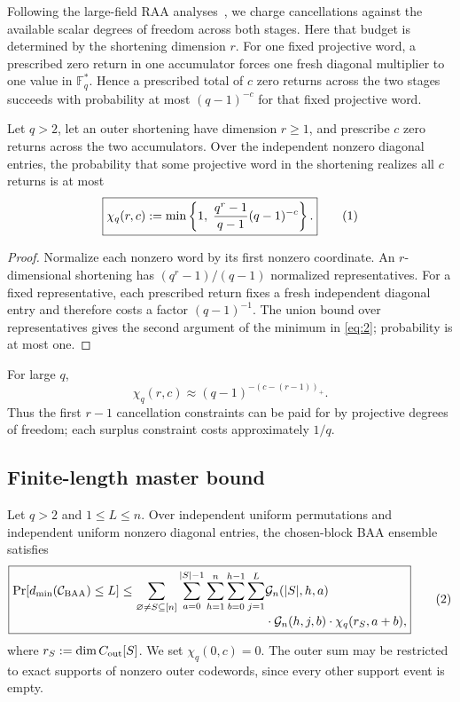 \documentclass[runningheads,envcountsame,envcountsect]{llncs}
\newcommand{\F}{\mathbb F}
\newcommand{\Prb}{\Pr}
\newcommand{\cC}{\mathcal C}
\newcommand{\cG}{\mathcal G}
\newcommand{\eqnumlabel}[1]{%
  \refstepcounter{equation}\tag{\theequation}\label{#1}%
}
\begin{document}
Following the large-field RAA analyses~\cite{akhiani26,khabbazian26}, we charge
cancellations against the available scalar degrees of freedom across both
stages.  Here that budget is determined by the shortening dimension $r$.
For one fixed projective word, a prescribed zero return in one accumulator
forces one fresh diagonal multiplier to one value in $\F_q^\ast$.
Hence a prescribed total of $c$ zero returns across the two stages succeeds
with probability at most $(q-1)^{-c}$ for that fixed projective word.

\begin{lemma}
\label{lem:projective-cancellation}
Let $q>2$, let an outer shortening have dimension $r\ge1$, and prescribe $c$
zero returns across the two accumulators.  Over the independent nonzero
diagonal entries, the probability that some projective word in the shortening
realizes all $c$ returns is at most
\[
    \boxed{
    \chi_q(r,c)
      :=
    \min\left\{
        1,\;
        \frac{q^r-1}{q-1}(q-1)^{-c}
    \right\}.
    }
    \eqnumlabel{eq:2}
\]
\end{lemma}

\begin{proof}
Normalize each nonzero word by its first nonzero coordinate.  An
$r$-dimensional shortening has $(q^r-1)/(q-1)$ normalized representatives.
For a fixed representative, each prescribed return fixes a fresh independent
diagonal entry and therefore costs a factor $(q-1)^{-1}$.  The union bound over
representatives gives the second argument of the minimum in \eqref{eq:2}; probability
is at most one.
\end{proof}

For large $q$,
\[
    \chi_q(r,c)
      \approx
    (q-1)^{-(c-(r-1))_+}.
\]
Thus the first $r-1$ cancellation constraints can be paid for by projective
degrees of freedom; each surplus constraint costs approximately $1/q$.

\subsection{Finite-length master bound}

\begin{theorem}
Let $q>2$ and $1\le L\le n$.  Over independent uniform permutations and
independent uniform nonzero diagonal entries, the chosen-block BAA ensemble
satisfies
\[
\boxed{
\begin{aligned}
\Prb[d_{\min}(\cC_{\rm BAA})\le L]
\le
\sum_{\substack{\varnothing\ne S\subseteq[n]}}
\sum_{a=0}^{|S|-1}
\sum_{h=1}^{n}
\sum_{b=0}^{h-1}
\sum_{j=1}^{L}
&\cG_n(|S|,h,a)
\\[-1mm]
&\cdot \cG_n(h,j,b)
\cdot \chi_q(r_S,a+b),
\end{aligned}
}
\eqnumlabel{eq:3}
\]
where $r_S:=\dim C_{\rm out}[S]$.
We set $\chi_q(0,c)=0$.  The outer sum may be restricted to exact
supports of nonzero outer codewords, since every other support event is empty.
\end{theorem}
\end{document}

